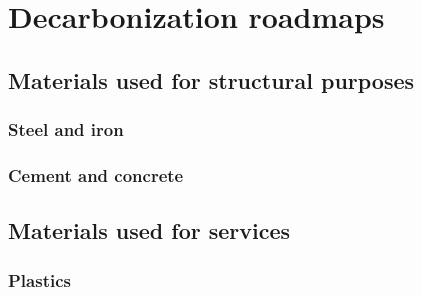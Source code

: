 \section{Decarbonization roadmaps}
\label{sec:Challenges_towards_the_construction_sector_decarbonization}

\subsection{Materials used for structural purposes}
\label{sec:circularity}

\subsubsection{Steel and iron}
\label{sec:circularity}

\subsubsection{Cement and concrete}
\label{sec:circularity}

\subsection{Materials used for services}
\label{sec:circularity}

\subsubsection{Plastics}
\label{sec:circularity}







